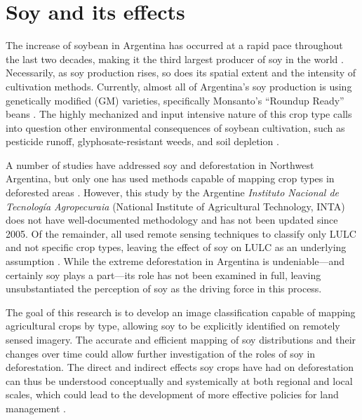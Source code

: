 \section{Soy and its effects}

The increase of soybean in Argentina has occurred at a rapid pace throughout the last two decades, making it the third largest producer of soy in the world \autocite{us-foreign-agri2013world}. Necessarily, as soy production rises, so does its spatial extent and the intensity of cultivation methods. Currently, almost all of Argentina’s soy production is using genetically modified (GM) varieties, specifically Monsanto’s “Roundup Ready” beans \autocite{greenpeace-inte2005the-expanding}. The highly mechanized and input intensive nature of this crop type calls into question other environmental consequences of soybean cultivation, such as pesticide runoff, glyphosate-resistant weeds, and soil depletion \autocite{pengue2005transgenic}.

A number of studies have addressed soy and deforestation in Northwest Argentina, but only one has used methods capable of mapping crop types in deforested areas \autocite{volante2005analisis}. However, this study by the Argentine \textit{Instituto Nacional de Tecnología Agropecuraia} (National Institute of Agricultural Technology, INTA) does not have well-documented methodology and has not been updated since 2005. Of the remainder, all used remote sensing techniques to classify only LULC and not specific crop types, leaving the effect of soy on LULC as an underlying assumption \autocites{grau2005agriculture}{grau2005globalization}{grau2008balancing}{boletta2006assessing}{gasparri2009deforestation}. While the extreme deforestation in Argentina is undeniable---and certainly soy plays a part---its role has not been examined in full, leaving unsubstantiated the perception of soy as the driving force in this process.

The goal of this research is to develop an image classification capable of mapping agricultural crops by type, allowing soy to be explicitly identified on remotely sensed imagery. The accurate and efficient mapping of soy distributions and their changes over time could allow further investigation of the roles of soy in deforestation. The direct and indirect effects soy crops have had on deforestation can thus be understood conceptually and systemically at both regional and local scales, which could lead to the development of more effective policies for land management \autocite{brown2007multitemporal}.
